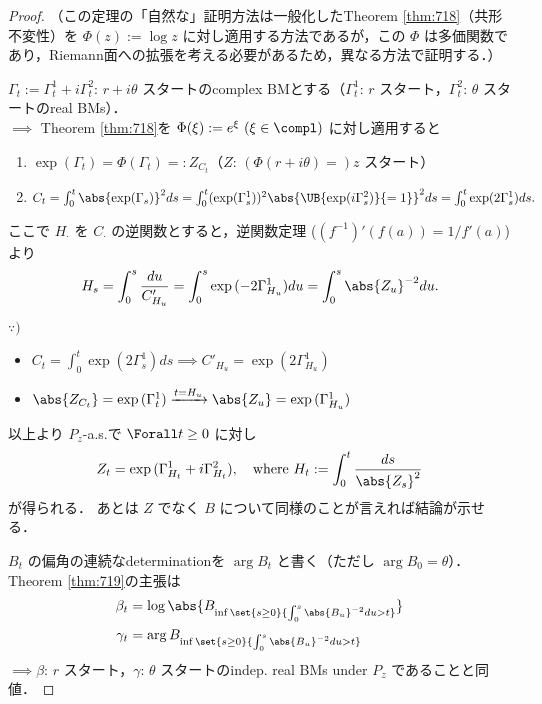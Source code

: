 \documentclass{jsarticle}
\begin{document}
\begin{proof}
    （この定理の「自然な」証明方法は一般化したTheorem \ref{thm:718}（共形不変性）を $\Phi(z):=\log z$ に対し適用する方法であるが，この $\Phi$ は多価関数であり，Riemann面への拡張を考える必要があるため，異なる方法で証明する．）

    $\Gamma_t:=\Gamma_t^1+i\Gamma_t^2$: $r+i\theta$ スタートのcomplex BMとする（$\Gamma_t^1$: $r$ スタート，$\Gamma_t^2$: $\theta$ スタートのreal BMs）．\\
    $\implies $ Theorem \ref{thm:718}を $\Phi(\xi):=e^{\xi}\ (\xi\in\compl)$ に対し適用すると
    \begin{enumerate}[label=(\roman*)]
        \item
        $\exp({\Gamma_t})=\Phi(\Gamma_t)=:Z_{C_t}$（$Z$: $(\Phi(r+i\theta)=)z$ スタート）
        \item
        $C_t=\int_0^t\abs{\exp({\Gamma_s})}^2ds=\int_0^t(\exp({\Gamma_s^1}))^2\abs{\UB{\exp({i\Gamma_s^2})}{=1}}^2ds=\int_0^t\exp({2\Gamma_s^1})ds.$
    \end{enumerate}

    ここで $H_{\cdot}$ を $C_{\cdot}$ の逆関数とすると，逆関数定理 ($(f^{-1})'(f(a))=1/f'(a)$) より
    \begin{align}
        H_s
        = \int_0^s\frac{du}{C'_{H_u}}
        = \int_0^s\exp{(-2\Gamma_{H_u}^1)}du
        = \int_0^s\abs{Z_u}^{-2}du.
    \end{align}

    \begin{screen}
        $\because)$
        \begin{itemize}
            \item 
            $C_t=\int_0^t\exp({2\Gamma_s^1})ds\implies C'_{H_u}=\exp({2\Gamma_{H_u}^1})$
            \item             $\abs{Z_{C_t}}=\exp{(\Gamma_t^1)}\xrightarrow{t=H_u}\abs{Z_u}=\exp{(\Gamma_{H_u}^1)}$
        \end{itemize}
    \end{screen}

    以上より $P_z$-a.s.で $\Forall t\ge0$ に対し
    $$
    Z_t=\exp{(\Gamma_{H_t}^1+i\Gamma_{H_t}^2)},\quad
    \text{where }H_t:=\int_0^t\frac{ds}{\abs{Z_s}^2}
    $$
    が得られる．
    あとは $Z$ でなく $B$ について同様のことが言えれば結論が示せる．

    $B_t$ の偏角の連続なdetermination\nazo を $\arg B_t$ と書く（ただし $\arg B_0=\theta$）．
    Theorem \ref{thm:719}の主張は
    \begin{align}
        \beta_t
        &= \log\abs{B_{\inf\set{s\ge0}{\int_0^s\abs{B_u}^{-2}du>t}}} \\
        \gamma_t
        &= \arg B_{\inf\set{s\ge0}{\int_0^s\abs{B_u}^{-2}du>t}}
    \end{align}
    $\implies \beta$: $r$ スタート，$\gamma$: $\theta$ スタートのindep. real BMs under $P_z$ であることと同値．


\end{proof}
\end{document}

